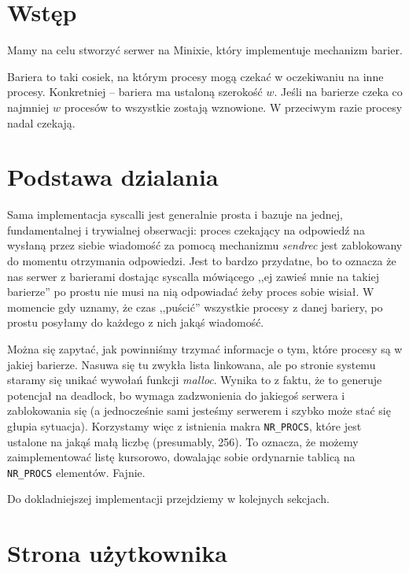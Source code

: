 \section{Wstęp}
Mamy na celu stworzyć serwer na Minixie, który implementuje mechanizm barier. 

Bariera to taki cosiek, na którym procesy mogą czekać w oczekiwaniu na inne procesy.
Konkretniej -- bariera ma ustaloną szerokość \( w \). Jeśli na barierze czeka co najmniej \( w \) procesów
to wszystkie zostają wznowione. W przeciwym razie procesy nadal czekają.

\section{Podstawa dzialania}

Sama implementacja syscalli jest generalnie prosta i bazuje na jednej, fundamentalnej i trywialnej obserwacji: proces czekający na odpowiedź na wysłaną przez siebie wiadomość za pomocą mechanizmu \textit{sendrec} jest zablokowany do momentu otrzymania odpowiedzi. Jest to bardzo przydatne, bo to oznacza że nas serwer z barierami dostając syscalla mówiącego ,,ej zawieś mnie na takiej barierze'' po prostu nie musi na nią odpowiadać żeby proces sobie wisiał. W momencie gdy uznamy, że czas ,,puścić'' wszystkie procesy z danej bariery, po prostu posyłamy do każdego z nich jakąś wiadomość. 

Można się zapytać, jak powinniśmy trzymać informacje o tym, które procesy są w jakiej barierze. Nasuwa się tu zwykła lista linkowana, ale po stronie systemu staramy się unikać wywołań funkcji \textit{malloc}. Wynika to z faktu, że to generuje potencjał na deadlock, bo wymaga zadzwonienia do jakiegoś serwera i zablokowania się (a jednocześnie sami jesteśmy serwerem i szybko może stać się głupia sytuacja). Korzystamy więc z istnienia makra \texttt{NR\_PROCS}, które jest ustalone na jakąś małą liczbę (presumably, 256). To oznacza, że możemy zaimplementować listę kursorowo, dowalając sobie ordynarnie tablicą na \texttt{NR\_PROCS} elementów. Fajnie. 

Do dokladniejszej implementacji przejdziemy w kolejnych sekcjach.

\section{Strona użytkownika}

